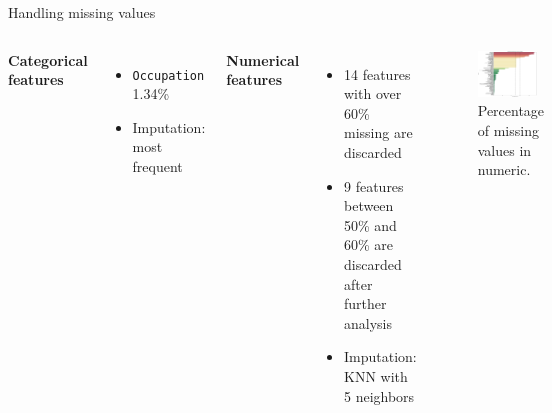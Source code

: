 \documentclass[aspectratio=169,xcolor=dvipsnames]{beamer}
\begin{document}

\begin{frame}{Handling missing values}

    \begin{columns}[c]
        \textbf{Categorical features}
        
        \begin{itemize}
            \item \texttt{Occupation} 1.34\%
            \item Imputation: most frequent
        \end{itemize}

        \vspace{0.5cm}
        \pause
        \textbf{Numerical features}

        \begin{itemize}
            \item 14 features with over 60\% missing are discarded
            \item 9 features between 50\% and 60\% are discarded after further analysis
            \item Imputation: KNN with 5 neighbors 
        \end{itemize}

        \begin{figure}[htpb]
            \centering
            \includegraphics[width=0.9\textwidth]{missing_values_percentages.pdf}
            \captionsetup{font=tiny} %
            \caption{Percentage of missing values in numeric.}
        \end{figure}
        
    \end{columns}

\end{frame}
\end{document}

